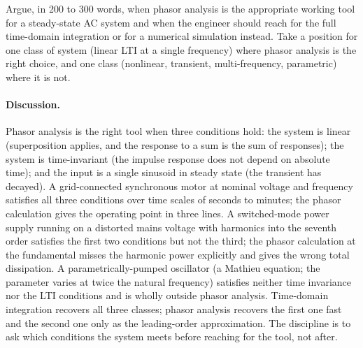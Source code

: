 \begin{exercise}
Argue, in 200 to 300 words, when phasor analysis is the
appropriate working tool for a steady-state AC system and when
the engineer should reach for the full time-domain integration
or for a numerical simulation instead. Take a position for one
class of system (linear LTI at a single frequency) where phasor
analysis is the right choice, and one class (nonlinear, transient,
multi-frequency, parametric) where it is not.

\paragraph{Discussion.}
Phasor analysis is the right tool when three conditions hold:
the system is linear (superposition applies, and the response to
a sum is the sum of responses); the system is time-invariant (the
impulse response does not depend on absolute time); and the input
is a single sinusoid in steady state (the transient has decayed).
A grid-connected synchronous motor at nominal voltage and
frequency satisfies all three conditions over time scales of
seconds to minutes; the phasor calculation gives the operating
point in three lines. A switched-mode power supply running on a
distorted mains voltage with harmonics into the seventh order
satisfies the first two conditions but not the third; the phasor
calculation at the fundamental misses the harmonic power
explicitly and gives the wrong total dissipation. A
parametrically-pumped oscillator (a Mathieu equation; the
parameter varies at twice the natural frequency) satisfies
neither time invariance nor the LTI conditions and is wholly
outside phasor analysis. Time-domain integration recovers all
three classes; phasor analysis recovers the first one fast and
the second one only as the leading-order approximation. The
discipline is to ask which conditions the system meets before
reaching for the tool, not after.
\end{exercise}

